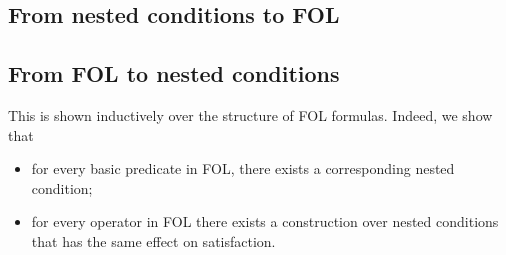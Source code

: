 \subsection{From nested conditions to FOL}

\subsection{From FOL to nested conditions}

This is shown inductively over the structure of FOL formulas. Indeed, we show that
\begin{itemize}
\item for every basic predicate in FOL, there exists a corresponding nested condition;
\item for every operator in FOL there exists a construction over nested conditions that has the same effect on satisfaction.
\end{itemize}
